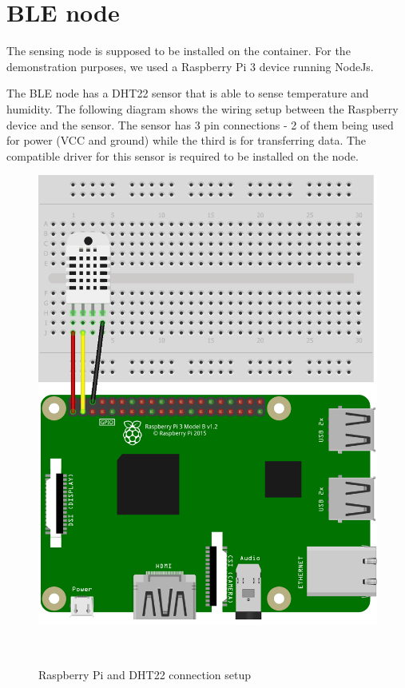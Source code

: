 \section {BLE node}
\label {Impl_BLEnodeSection}

The sensing node is supposed to be installed on the container. For the demonstration purposes, we used a Raspberry Pi 3 device running NodeJs.

The BLE node has a DHT22 sensor that is able to sense temperature and humidity. The following diagram shows the wiring setup between the Raspberry device and the sensor. The sensor has 3 pin connections - 2 of them being used for power (VCC and ground) while the third is for transferring data. The compatible driver for this sensor is required to be installed on the node.


\begin{figure}[H]
\centering
\includegraphics[scale=0.7]{gfx/RaspberrySensorNode} 
\caption{Raspberry Pi and DHT22 connection setup}~\label{fig:RaspberrySensorNode}
\end{figure}


